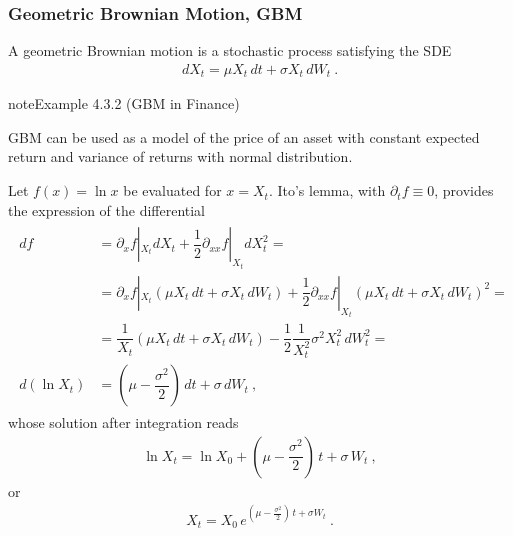 \documentclass[letterpaper,10pt,english]{jupyterBook}
\begin{document}
\subsubsection{Geometric Brownian Motion, GBM}
\label{\detokenize{ch/prob/processes-calculus:geometric-brownian-motion-gbm}}\label{\detokenize{ch/prob/processes-calculus:prob-processes-calculus-ito-process-gbm}}
\sphinxAtStartPar
A geometric Brownian motion is a stochastic process satisfying the SDE
\begin{equation*}
\begin{split}d X_t = \mu X_t \, dt + \sigma X_t \, dW_t \ .\end{split}
\end{equation*}\label{ch/prob/processes-calculus:example:gbm:finance}
\begin{sphinxadmonition}{note}{Example 4.3.2 (GBM in Finance)}



\sphinxAtStartPar
GBM can be used as a model of the price of an asset with constant expected return and variance of returns with normal distribution.
\end{sphinxadmonition}

\sphinxAtStartPar
Let \(f(x) = \ln x\) be evaluated for \(x = X_t\). Ito’s lemma, with \(\partial_t f \equiv 0\), provides the expression of the differential
\begin{equation*}
\begin{split}\begin{aligned}
  d f
  & = \partial_x f|_{X_t} d X_t + \dfrac{1}{2} \partial_{xx} f|_{X_t} d X_t^2 = \\
  & = \partial_x f|_{X_t} \left( \mu X_t \, dt + \sigma X_t \, dW_t \right) + \dfrac{1}{2} \partial_{xx} f|_{X_t}  \left( \mu X_t \, dt + \sigma X_t \, dW_t \right)^2 = \\
  & = \dfrac{1}{X_t} \left( \mu X_t \, dt + \sigma X_t \, dW_t \right) - \dfrac{1}{2} \dfrac{1}{X_t^2} \sigma^2 X^2_t \, dW^2_t = \\
  d \left( \ln X_t \right) & = \left( \mu - \dfrac{\sigma^2}{2} \right) \, dt + \sigma \, dW_t \ ,
\end{aligned}\end{split}
\end{equation*}
\sphinxAtStartPar
whose solution after integration reads
\begin{equation*}
\begin{split}\ln X_t = \ln X_0 + \left( \mu - \dfrac{\sigma^2}{2} \right) \, t + \sigma \, W_t \ ,\end{split}
\end{equation*}
\sphinxAtStartPar
or
\begin{equation*}
\begin{split}X_t = X_0 \, e^{\left( \mu - \frac{\sigma^2}{2} \right) \, t + \sigma W_t} \ .\end{split}
\end{equation*}
\end{document}
